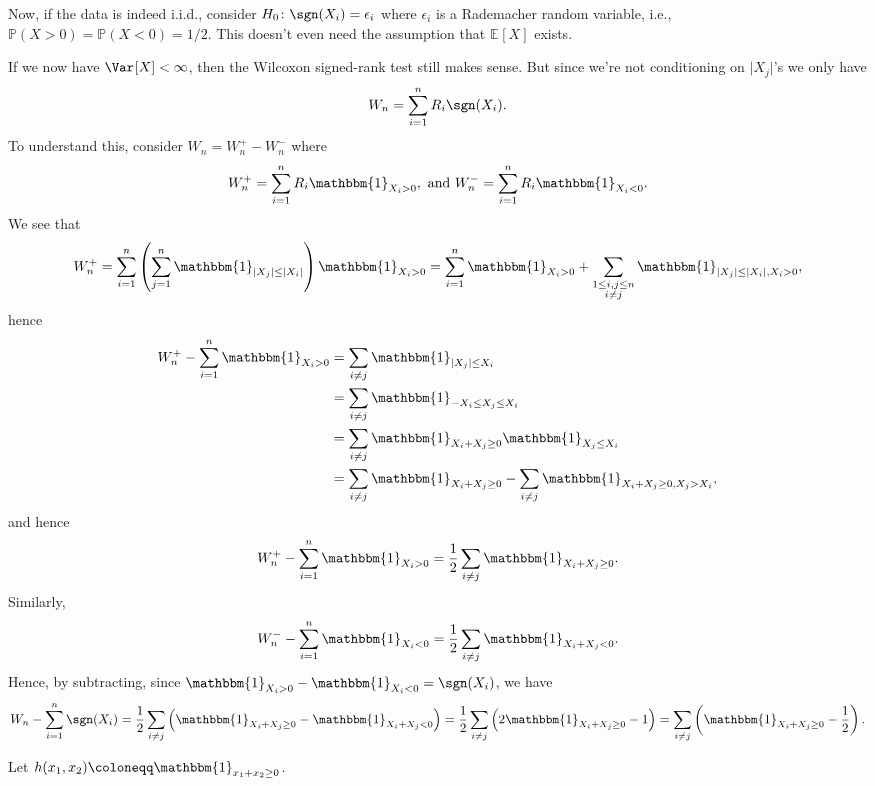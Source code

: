 Now, if the data is indeed i.i.d., consider \(H_0 \colon \sgn (X_i) = \epsilon _i\) where \(\epsilon _i\) is a Rademacher random variable, i.e., \(\mathbb{P} (X > 0) = \mathbb{P} (X < 0) = 1 / 2\). This doesn't even need the assumption that \(\mathbb{E}_{}[X] \) exists.

If we now have \(\Var_{}[X] < \infty \), then the Wilcoxon signed-rank test still makes sense. But since we're not conditioning on \(\vert X_j \vert \)'s we only have
\[
	W_n = \sum_{i=1}^{n} R_i \sgn (X_i).
\]
To understand this, consider \(W_n = W_n^+ - W_n^-\) where
\[
	W_n^+ = \sum_{i=1}^{n} R_i \mathbbm{1}_{X_i > 0} ,\text{ and }
	W_n^- = \sum_{i=1}^{n} R_i \mathbbm{1}_{X_i < 0}.
\]
We see that
\[
	W_n^+
	= \sum_{i=1}^{n} \left( \sum_{j=1}^{n} \mathbbm{1}_{\vert X_j \vert \leq \vert X_i \vert } \right) \mathbbm{1}_{X_i > 0}
	= \sum_{i=1}^{n} \mathbbm{1}_{X_i > 0} + \sum_{\substack{1 \leq i, j \leq n \\ i \neq j}} \mathbbm{1}_{\vert X_j \vert \leq \vert X_i \vert , X_i > 0},
\]
hence
\[
	\begin{split}
		W_n^+ - \sum_{i=1}^{n} \mathbbm{1}_{X_i > 0}
		 & = \sum_{i \neq j} \mathbbm{1}_{\vert X_j \vert \leq X_i}                                                      \\
		 & = \sum_{i \neq j} \mathbbm{1}_{-X_i \leq X_j \leq X_i}                                                        \\
		 & = \sum_{i \neq j} \mathbbm{1}_{X_i + X_j \geq 0} \mathbbm{1}_{X_j \leq X_i}                                   \\
		 & = \sum_{i \neq j} \mathbbm{1}_{X_i + X_j \geq 0} - \sum_{i \neq j} \mathbbm{1}_{X_i + X_j \geq 0, X_j > X_i},
	\end{split}
\]
and hence
\[
	W_n^+ - \sum_{i=1}^{n} \mathbbm{1}_{X_i > 0}
	= \frac{1}{2} \sum_{i \neq j} \mathbbm{1}_{X_i + X_j \geq 0}.
\]
Similarly,
\[
	W_n^- - \sum_{i=1}^{n} \mathbbm{1}_{X_i < 0}
	= \frac{1}{2} \sum_{i \neq j} \mathbbm{1}_{X_i + X_j < 0} .
\]
Hence, by subtracting, since \(\mathbbm{1}_{X_i > 0} - \mathbbm{1}_{X_i < 0} = \sgn (X_i) \), we have
\[
	W_n - \sum_{i=1}^{n} \sgn (X_i)
	= \frac{1}{2} \sum_{i \neq j} \left( \mathbbm{1}_{X_i + X_j \geq 0} - \mathbbm{1}_{X_i + X_j < 0} \right)
	= \frac{1}{2} \sum_{i \neq j} \left( 2 \mathbbm{1}_{X_i + X_j \geq 0} - 1 \right)
	= \sum_{i \neq j} \left( \mathbbm{1}_{X_i + X_j \geq 0} - \frac{1}{2} \right).
\]

\begin{notation}
	Let \(h(x_1, x_2) \coloneqq \mathbbm{1}_{x_1 + x_2 \geq 0} \).
\end{notation}

